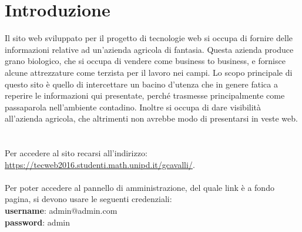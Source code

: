 \newpage
\section{Introduzione}
Il sito web sviluppato per il progetto di tecnologie web si occupa di fornire delle informazioni relative ad un'azienda agricola di fantasia. Questa azienda produce grano biologico, che si occupa di vendere come business to business, e fornisce alcune attrezzature come terzista per il lavoro nei campi.
Lo scopo principale di questo sito è quello di intercettare un bacino d'utenza che in genere fatica a reperire le informazioni qui presentate, perché trasmesse principalmente come passaparola nell'ambiente contadino. Inoltre si occupa di dare visibilità all'azienda agricola, che altrimenti non avrebbe modo di presentarsi in veste web.
~\\ ~\\
Per accedere al sito recarsi all'indirizzo:\\ \url{https://tecweb2016.studenti.math.unipd.it/gcavalli/}.~\\ ~\\
Per poter accedere al pannello di amministrazione, del quale link è a fondo pagina, si devono usare le seguenti credenziali:\\ 
\textbf{username}: admin@admin.com\\ 
\textbf{password}: admin